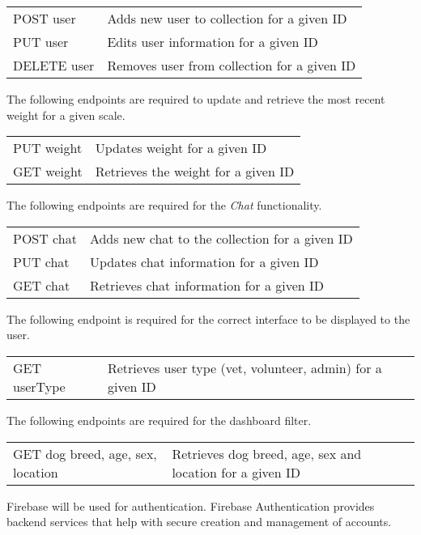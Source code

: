 \begin{tabular}{l|l}
POST user & Adds new user to collection for a given ID\\
PUT user & Edits user information for a given ID\\
DELETE user & Removes user from collection for a given ID\\
\end{tabular}

The following endpoints are required to update and retrieve the most recent weight for a given scale.

\begin{tabular}{l|l}
PUT weight & Updates weight for a given ID\\
GET weight & Retrieves the weight for a given ID\\
\end{tabular}

The following endpoints are required for the \textit{Chat} functionality.

\begin{tabular}{l|l}
POST chat & Adds new chat to the collection for a given ID\\
PUT chat & Updates chat information for a given ID\\
GET chat & Retrieves chat information for a given ID\\
\end{tabular}

The following endpoint is required for the correct interface to be displayed to the user.

\begin{tabular}{l|l}
GET userType & Retrieves user type (vet, volunteer, admin) for a given ID\\
\end{tabular}

The following endpoints are required for the dashboard filter.

\newlength\q
\newlength\qq
\setlength{}
\setlength{}
\begin{tabular}{p{\q}|p{\qq}}
GET dog breed, age, sex, location & Retrieves dog breed, age, sex and location for a given ID\\
\end{tabular}

Firebase will be used for authentication. Firebase Authentication provides backend services that help with secure creation and management of accounts.

